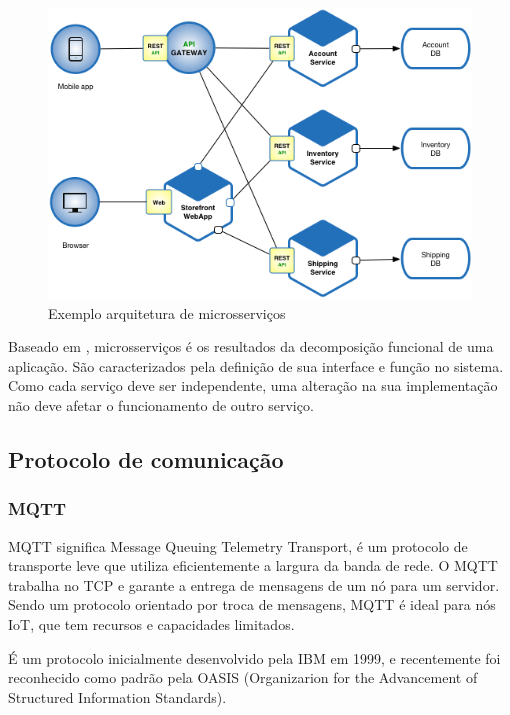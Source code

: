 \begin{figure}[htbp]
	\centering
	\includegraphics[width=1\linewidth]{figuras/Microservice_Architecture.png}
	\caption{Exemplo arquitetura de microsserviços}
	\label{fig:arquitetura-microsservicos}
\end{figure}

Baseado em \cite{Pahl}, microsserviços é os resultados da decomposição funcional de uma aplicação. São caracterizados pela definição de sua interface e função no sistema. Como cada serviço deve ser independente, uma alteração na sua implementação não deve afetar o funcionamento de outro serviço.

\subsection{Protocolo de comunicação}

\subsubsection{MQTT}

MQTT significa Message Queuing Telemetry Transport, é um protocolo de transporte leve que utiliza eficientemente a largura da banda de rede.\cite{mqtt1} O MQTT trabalha no TCP e garante a entrega de mensagens de um nó para um servidor. Sendo um protocolo orientado por troca de mensagens, MQTT é ideal para nós IoT, que tem recursos e capacidades limitados.

É um protocolo inicialmente desenvolvido pela IBM \cite{mqtt-ibm} em 1999, e recentemente foi reconhecido como padrão pela OASIS (Organizarion for the Advancement of Structured Information Standards).\cite{mqtt-oasis}

